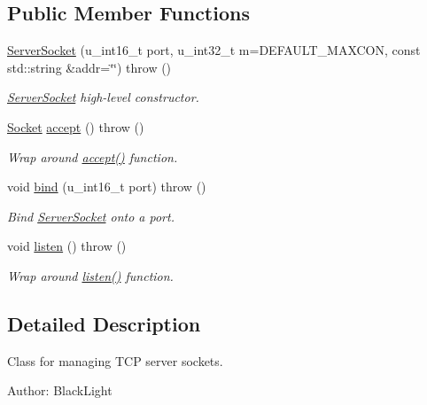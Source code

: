 \subsection*{Public Member Functions}
\begin{CompactItemize}
\item 
\hyperlink{classusock_1_1ServerSocket_0ac1908d4a4afb675715ae0ad994e870}{ServerSocket} (u\_\-int16\_\-t port, u\_\-int32\_\-t m=DEFAULT\_\-MAXCON, const std::string \&addr=\char`\"{}\char`\"{})  throw ()
\begin{CompactList}\small\item\em \hyperlink{classusock_1_1ServerSocket}{ServerSocket} high-level constructor. \item\end{CompactList}\item 
\hyperlink{classusock_1_1Socket}{Socket} \hyperlink{classusock_1_1ServerSocket_bf0477af52a725ced6afad86d7b3e794}{accept} ()  throw ()
\begin{CompactList}\small\item\em Wrap around \hyperlink{classusock_1_1ServerSocket_bf0477af52a725ced6afad86d7b3e794}{accept()} function. \item\end{CompactList}\item 
void \hyperlink{classusock_1_1ServerSocket_9ecf37cae8379df6eaf366ab88df244a}{bind} (u\_\-int16\_\-t port)  throw ()
\begin{CompactList}\small\item\em Bind \hyperlink{classusock_1_1ServerSocket}{ServerSocket} onto a port. \item\end{CompactList}\item 
void \hyperlink{classusock_1_1ServerSocket_c6cd2070380b84275c5f69265c57713b}{listen} ()  throw ()
\begin{CompactList}\small\item\em Wrap around \hyperlink{classusock_1_1ServerSocket_c6cd2070380b84275c5f69265c57713b}{listen()} function. \item\end{CompactList}\end{CompactItemize}


\subsection{Detailed Description}
Class for managing TCP server sockets. 

\begin{Desc}
\item[Author:]BlackLight \end{Desc}


